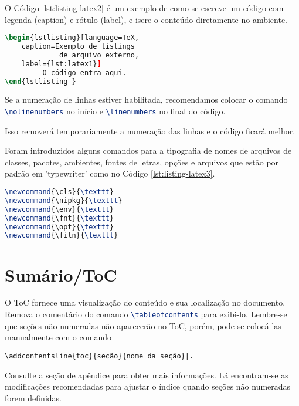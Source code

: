      O Código \ref{lst:listing-latex2} é um exemplo de como se escreve um código com legenda (caption) e rótulo (label), e isere o conteúdo diretamente no ambiente.
    \nolinenumbers
\begin{lstlisting}[language=TeX,caption=Exemplo de listings com código em arquivo externo,label={lst:listing-latex2}]
\begin{lstlisting}[language=TeX,
    caption=Exemplo de listings 
             de arquivo externo,
    label={lst:latex1}]
         O código entra aqui.
\end{lstlisting }
\end{lstlisting}
    
    
    Se a numeração de linhas estiver habilitada, recomendamos colocar o comando \lstinline[language=TeX]|\nolinenumbers| no início e \lstinline[language=TeX]|\linenumbers| no final do código. 
    
    Isso removerá temporariamente a numeração das linhas e o código ficará melhor.
    
    Foram introduzidos alguns comandos para a tipografia de nomes de arquivos de classes, pacotes, ambientes, fontes de letras, opções e arquivos que estão por padrão em 'typewriter' como no Código \ref{lst:listing-latex3}.
\begin{lstlisting}[language=TeX,caption={Tipografia de nomes de arquivos, ambientes, fontes de letras, etc},label={lst:listing-latex3}]
\newcommand{\cls}{\texttt}
\newcommand{\nipkg}{\texttt}
\newcommand{\env}{\texttt}
\newcommand{\fnt}{\texttt}
\newcommand{\opt}{\texttt}
\newcommand{\filn}{\texttt}
\end{lstlisting}



\section{Sumário/ToC}

    O ToC fornece uma visualização do conteúdo e sua localização no documento. Remova o comentário do comando \lstinline[language=TeX]|\tableofcontents| para exibi-lo. Lembre-se que seções não numeradas não aparecerão no ToC, porém, pode-se colocá-las manualmente com o comando 
\begin{lstlisting}
\addcontentsline{toc}{seção}{nome da seção}|. 
\end{lstlisting}


    Consulte a seção de apêndice para obter mais informações. Lá encontram-se as modificações recomendadas para ajustar o índice quando seções não numeradas forem definidas.

